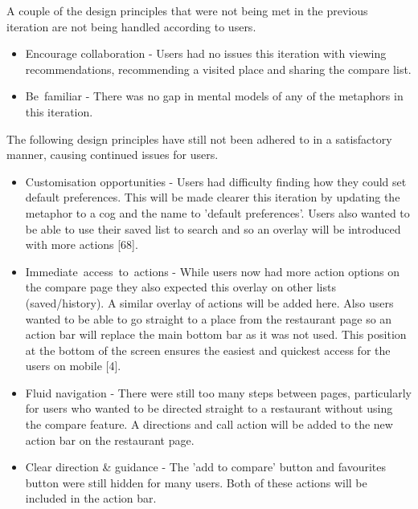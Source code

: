 \documentclass[a4 paper, 12pt]{article}
\begin{document}
    A couple of the design principles that were not being met in the previous iteration are not being handled according to users. 
    \begin{itemize}
        \item Encourage collaboration - Users had no issues this iteration with viewing recommendations, recommending a visited place and sharing the compare list.
        \item Be familiar - There was no gap in mental models of any of the metaphors in this iteration.    
    \end{itemize}
       
    The following design principles have still not been adhered to in a satisfactory manner, causing continued issues for users.
    \begin{itemize}
        \item Customisation opportunities - Users had difficulty finding how they could set default preferences. This will be made clearer this iteration by updating the metaphor to a cog and the name to 'default preferences'. Users also wanted to be able to use their saved list to search and so an overlay will be introduced with more actions [68].
        \item Immediate access to actions - While users now had more action options on the compare page they also expected this overlay on other lists (saved/history). A similar overlay of actions will be added here. Also users wanted to be able to go straight to a place from the restaurant page so an action bar will replace the main bottom bar as it was not used. This position at the bottom of the screen ensures the easiest and quickest access for the users on mobile [4].
        \item Fluid navigation - There were still too many steps between pages, particularly for users who wanted to be directed straight to a restaurant without using the compare feature. A directions and call action will be added to the new action bar on the restaurant page.
        \item Clear direction \& guidance - The 'add to compare' button and favourites button were still hidden for many users. Both of these actions will be included in the action bar.
    \end{itemize}
    
\end{document}
